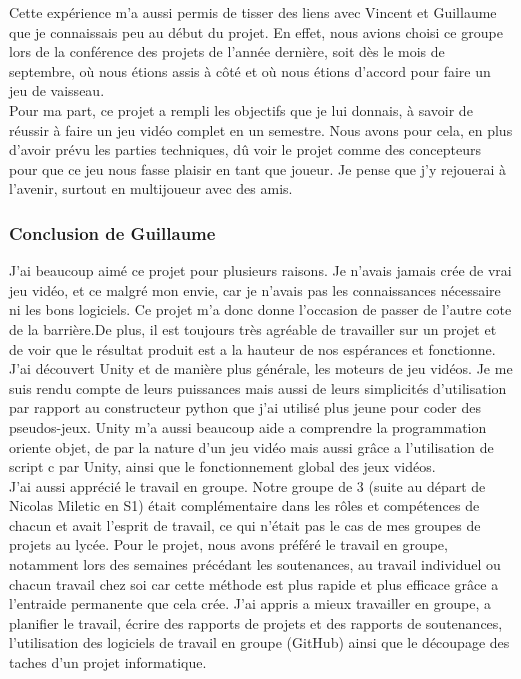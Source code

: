 \documentclass[12pt, titlepage]{article}
\begin{document}
\begin{spacing}{1.5}
Cette expérience m'a aussi permis de tisser des liens avec Vincent et Guillaume que je connaissais peu au début du projet. En effet, nous avions choisi ce groupe lors de la conférence des projets de l'année dernière, soit dès le mois de septembre, où nous étions assis à côté et où nous étions d'accord pour faire un jeu de vaisseau.\\

Pour ma part, ce projet a rempli les objectifs que je lui donnais, à savoir de réussir à faire un jeu vidéo complet en un semestre. Nous avons pour cela, en plus d'avoir prévu les parties techniques, dû voir le projet comme des concepteurs pour que ce jeu nous fasse plaisir en tant que joueur. Je pense que j'y rejouerai à l'avenir, surtout en multijoueur avec des amis.\\

\subsubsection{Conclusion de Guillaume}

J'ai beaucoup aimé ce projet pour plusieurs raisons. Je n'avais jamais crée de vrai jeu vidéo, et ce malgré mon  envie, car je n'avais pas les connaissances nécessaire ni les bons logiciels. Ce projet m'a donc donne l'occasion de passer de l'autre cote de la barrière.De plus, il est toujours très agréable de travailler sur un projet et de voir que le résultat produit est a la hauteur de nos espérances et fonctionne.\\


J'ai découvert Unity et de manière plus générale, les moteurs de jeu vidéos. Je me suis rendu compte de leurs puissances mais aussi de leurs simplicités d'utilisation par rapport au constructeur python que j'ai utilisé plus jeune pour coder des pseudos-jeux. Unity m'a aussi beaucoup aide a comprendre la programmation oriente objet, de par la nature d'un jeu vidéo mais aussi grâce a l'utilisation de script c par Unity, ainsi que le fonctionnement global des jeux vidéos.\\

J'ai aussi apprécié le travail en groupe. Notre groupe de 3 (suite au départ de Nicolas Miletic en S1) était complémentaire dans les rôles et compétences de chacun et avait l'esprit de travail, ce qui n'était pas le cas de mes groupes de projets au lycée. Pour le projet, nous avons préféré le travail en groupe, notamment lors des semaines précédant les soutenances, au travail individuel ou chacun travail chez soi car cette méthode est plus rapide et plus efficace grâce a l'entraide permanente que cela crée. J'ai appris a mieux travailler en groupe, a planifier le travail, écrire des rapports de projets et des rapports de soutenances, l'utilisation des logiciels de travail en groupe (GitHub) ainsi que le découpage des taches d'un projet informatique. \\


\end{spacing}
\end{document}
